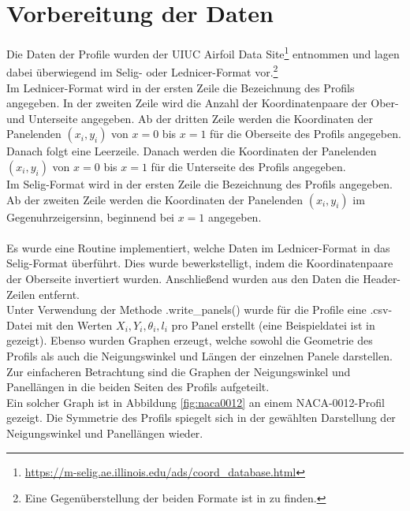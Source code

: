 \section{Vorbereitung der Daten}
Die Daten der Profile wurden der UIUC Airfoil Data Site\footnote{\url{https://m-selig.ae.illinois.edu/ads/coord_database.html}} entnommen und lagen dabei überwiegend im Selig- oder Lednicer-Format vor.\footnote{Eine Gegenüberstellung der beiden Formate ist in  zu finden.}
\\
Im Lednicer-Format wird in der ersten Zeile die Bezeichnung des Profils angegeben. In der zweiten Zeile wird die Anzahl der Koordinatenpaare der Ober- und Unterseite angegeben. Ab der dritten Zeile werden die Koordinaten der Panelenden $(x_i,y_i)$ von $x=0$ bis $x=1$ für die Oberseite des Profils angegeben. Danach folgt eine Leerzeile. Danach werden die Koordinaten der Panelenden $(x_i,y_i)$ von $x=0$ bis $x=1$ für die Unterseite des Profils angegeben.
\\
Im Selig-Format wird in der ersten Zeile die Bezeichnung des Profils angegeben. Ab der zweiten Zeile werden die Koordinaten der Panelenden $(x_i,y_i)$ im Gegenuhrzeigersinn, beginnend bei $x=1$ angegeben.
\\\\
Es wurde eine Routine implementiert, welche Daten im Lednicer-Format in das Selig-Format überführt. Dies wurde bewerkstelligt, indem die Koordinatenpaare der Oberseite invertiert wurden. Anschließend wurden aus den Daten die Header-Zeilen entfernt. \\
Unter Verwendung der Methode .write\_panels() wurde für die Profile eine .csv-Datei mit den Werten $X_i, Y_i, \theta _i, l_i$ pro Panel erstellt (eine Beispieldatei ist in  gezeigt). Ebenso wurden Graphen erzeugt, welche sowohl die Geometrie des Profils als auch die Neigungswinkel und Längen der einzelnen Panele darstellen. Zur einfacheren Betrachtung sind die Graphen der Neigungswinkel und Panellängen in die beiden Seiten des Profils aufgeteilt. 
\\Ein solcher Graph ist in Abbildung \ref{fig:naca0012} an einem NACA-0012-Profil gezeigt. Die Symmetrie des Profils spiegelt sich in der gewählten Darstellung der Neigungswinkel und Panellängen wieder.

